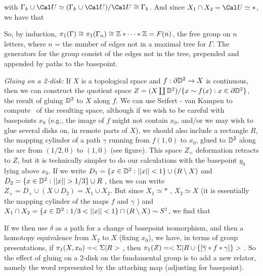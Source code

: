 \ssk


\ssk

with $\Gamma_{k}\cup{\Cal U}\simeq (\Gamma_{k}\cup{\Cal U})/{\Cal U}\cong \Gamma_{k}$. 
And since $X_1\cap X_2={\Cal U}\simeq *$, we have that 


So, by induction, $\pi_1(\Gamma) \cong \pi_1(\Gamma_{n})\cong {\Bbb Z}*\cdots *{\Bbb Z} = F(n)$, the free group on $n$ letters, where $n$ = the number of edges not in a maximal tree for $\Gamma$. The generators for the group consist of the
edges not in the tree, prepended and appended by paths to the basepoint.

\msk

{\it Gluing on a 2-disk:} If $X$ is a topological space and $f:\partial {\Bbb D}^2\rightarrow X$ is continuous, then we
can construct the quotient space $Z=(X\coprod {\Bbb D}^2)/\{x\sim f(x) : x\in\partial{\Bbb D}^2\}$,
the result of gluing ${\Bbb D}^2$ to $X$ along $f$. 
We can use Seifert - van Kampen to compute \mpu\ of the resulting space, although if we
wish to be careful with basepoints $x_0$ 
(e.g., the image of $f$ might not contain $x_0$, and/or we
may wish to glue several disks on, in remote parts of $X$),
we should also include a rectangle $R$, the mapping cylinder of a path $\gamma$ running from 
$f(1,0)$ to $x_0$, glued to 
${\Bbb D}^2$ along the arc from $(1/2,0)$ to $(1,0)$ (see figure). 
This space $Z_+$ deformation retracts to $Z$, but it
is technically simpler to do our calculations with the basepoint $y_0$ lying above $x_0$.
If we write $D_1 = \{x\in {\Bbb D}^2 : ||x||<1\}\cup(R\setminus X)$ 
and $D_2 = \{x\in {\Bbb D}^2 : ||x||>1/3\}\cup R$ , then we can write $Z_+=D_+\cup(X\cup D_2) = X_1\cup X_2$.
But since $X_1\simeq *$ , $X_2\simeq X$ 
(it is essentially the mapping cylinder of the maps $f$ and $\gamma$ )
and $X_1\cap X_2 = \{x\in {\Bbb D}^2 : 1/3<||x||<1\}\cap(R\setminus X)\sim S^1$, we find that 


If we then use $\delta$ as a path for a change of basepoint isomorphism, and then a homotopy
equivalence from $X_2$ to $X$ (fixing $x_0$), we have, in terms of group presentations, 
if $\pi_1(X,x_0)=<\Sigma | R>$ , then $\pi_1(Z) = <\Sigma | R\cup\{[\overline{\gamma}*f*\gamma]\}>$ . 
So the effect of gluing on a 2-disk on the fundamental group is to add a new relator, 
namely the word represented by the attaching map (adjusting for basepoint).

